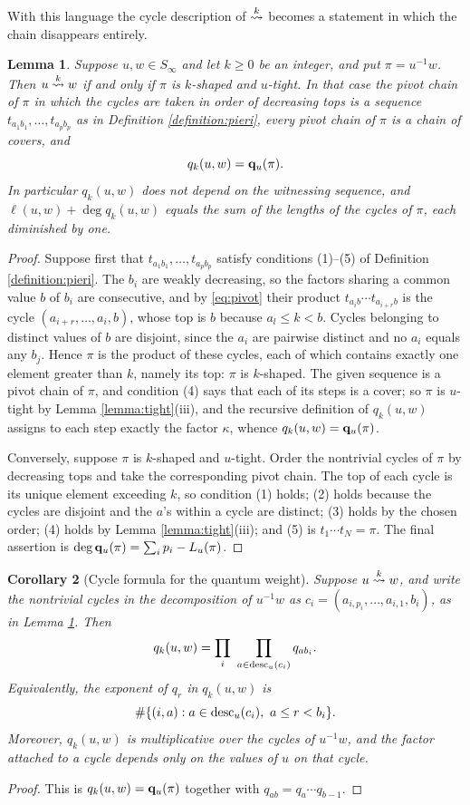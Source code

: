 \documentclass{amsart}
\newtheorem{lemma}{Lemma}[section]
\newtheorem{corollary}[lemma]{Corollary}
\theoremstyle{definition}
\theoremstyle{remark}
\numberwithin{equation}{section}
\newcommand{\xrightsquigarrow}[2][]{%
	\mathrel{\mathop{\rightsquigarrow}\limits^{\scriptstyle #2}%
	\ifx\hfuzz#1\hfuzz\else_{\scriptstyle #1}\fi}%
}
\newcommand{\tom}[1]{\ensuremath{\xrightsquigarrow{#1}}}
\begin{document}
With this language the cycle description of $\tom{k}$ becomes a statement in which the chain disappears entirely.

\begin{lemma} \label{lemma:piericycle}
Suppose $u,w\in S_\infty$ and let $k\geq0$ be an integer, and put $\pi=u^{-1}w$. Then $u\tom{k} w$ if and only if $\pi$ is $k$-shaped and $u$-tight. In that case the pivot chain of $\pi$ in which the cycles are taken in order of decreasing tops is a sequence $t_{a_1b_1},\ldots,t_{a_pb_p}$ as in Definition \ref{definition:pieri}, every pivot chain of $\pi$ is a chain of covers, and
$$q_k(u,w)=\mathbf{q}_u(\pi).$$
In particular $q_k(u,w)$ does not depend on the witnessing sequence, and $\ell(u,w)+\deg q_k(u,w)$ equals the sum of the lengths of the cycles of $\pi$, each diminished by one.
\end{lemma}
\begin{proof}
Suppose first that $t_{a_1b_1},\ldots,t_{a_pb_p}$ satisfy conditions (1)--(5) of Definition \ref{definition:pieri}. The $b_i$ are weakly decreasing, so the factors sharing a common value $b$ of $b_i$ are consecutive, and by \eqref{eq:pivot} their product $t_{a_ib}\cdots t_{a_{i+r}b}$ is the cycle $(a_{i+r},\ldots,a_i,b)$, whose top is $b$ because $a_l\leq k<b$. Cycles belonging to distinct values of $b$ are disjoint, since the $a_i$ are pairwise distinct and no $a_i$ equals any $b_j$. Hence $\pi$ is the product of these cycles, each of which contains exactly one element greater than $k$, namely its top: $\pi$ is $k$-shaped. The given sequence is a pivot chain of $\pi$, and condition (4) says that each of its steps is a cover; so $\pi$ is $u$-tight by Lemma \ref{lemma:tight}(iii), and the recursive definition of $q_k(u,w)$ assigns to each step exactly the factor $\kappa$, whence $q_k(u,w)=\mathbf{q}_u(\pi)$.

Conversely, suppose $\pi$ is $k$-shaped and $u$-tight. Order the nontrivial cycles of $\pi$ by decreasing tops and take the corresponding pivot chain. The top of each cycle is its unique element exceeding $k$, so condition (1) holds; (2) holds because the cycles are disjoint and the $a$'s within a cycle are distinct; (3) holds by the chosen order; (4) holds by Lemma \ref{lemma:tight}(iii); and (5) is $t_1\cdots t_N=\pi$. The final assertion is $\deg\mathbf{q}_u(\pi)=\sum_ip_i-L_u(\pi)$.
\end{proof}

\begin{corollary}[Cycle formula for the quantum weight] \label{corollary:cycleweight}
Suppose $u\tom{k}w$, and write the nontrivial cycles in the decomposition of
$u^{-1}w$ as $c_i=(a_{i,p_i},\ldots,a_{i,1},b_i)$, as in Lemma
\ref{lemma:piericycle}. Then
\[
q_k(u,w)=\prod_i\ \prod_{a\in\mathrm{desc}_u(c_i)}q_{a b_i}.
\]
Equivalently, the exponent of $q_r$ in $q_k(u,w)$ is
\[
\#\{(i,a):a\in\mathrm{desc}_u(c_i),\ a\leq r<b_i\}.
\]
Moreover, $q_k(u,w)$ is multiplicative over the cycles of $u^{-1}w$, and the factor attached to a cycle depends only on the values of $u$ on that cycle.
\end{corollary}
\begin{proof}
This is $q_k(u,w)=\mathbf{q}_u(\pi)$ together with $q_{ab}=q_a\cdots q_{b-1}$.
\end{proof}
\end{document}
